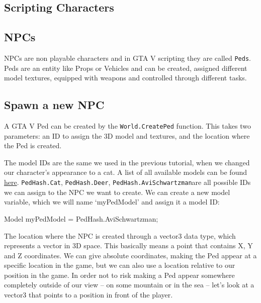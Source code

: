 \documentclass[
  openany]{book}
\newenvironment{Shaded}{\begin{snugshade}}{\end{snugshade}}
\newcommand{\FunctionTok}[1]{\textcolor[rgb]{0.00,0.00,0.00}{#1}}
\newcommand{\NormalTok}[1]{#1}
\begin{document}
\hypertarget{scripting-characters}{%
\subsection*{Scripting Characters}\label{scripting-characters}}

\hypertarget{npcs}{%
\subsection*{NPCs}\label{npcs}}

NPCs are non playable characters and in GTA V scripting they are called \texttt{Peds}. Peds are an entity like Props or Vehicles and can be created, assigned different model textures, equipped with weapons and controlled through different tasks.

\hypertarget{spawn-a-new-npc}{%
\subsection*{Spawn a new NPC}\label{spawn-a-new-npc}}

A GTA V Ped can be created by the \texttt{World.CreatePed} function. This takes two parameters: an ID to assign the 3D model and textures, and the location where the Ped is created.

The model IDs are the same we used in the previous tutorial, when we changed our character's appearance to a cat. A list of all available models can be found \href{https://wiki.gtanet.work/index.php/Peds}{here}. \texttt{PedHash.Cat}, \texttt{PedHash.Deer}, \texttt{PedHash.AviSchwartzman}are all possible IDs we can assign to the NPC we want to create.
We can create a new model variable, which we will name `myPedModel' and assign it a model ID:

\begin{Shaded}
\begin{Highlighting}[]
\NormalTok{Model myPedModel = PedHash.}\FunctionTok{AviSchwartzman}\NormalTok{;}
\end{Highlighting}
\end{Shaded}

The location where the NPC is created through a vector3 data type, which represents a vector in 3D space. This basically means a point that contains X, Y and Z coordinates. We can give absolute coordinates, making the Ped appear at a specific location in the game, but we can also use a location relative to our position in the game. In order not to risk making a Ped appear somewhere completely outside of our view -- on some mountain or in the sea -- let's look at a vector3 that points to a position in front of the player.
\end{document}
